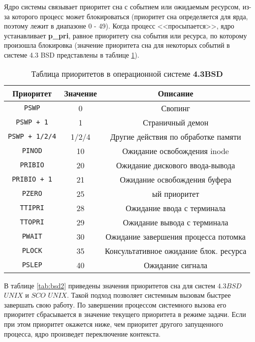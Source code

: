 Ядро системы связывает приоритет сна с событием или ожидаемым ресурсом, из-за которого процесс может блокироваться (приоритет сна определяется для ярда, поэтому лежит в диапазоне 0 - 49). Когда процесс <<просыпается>>, ядро устанавливает \textbf{p\_pri}, равное приоритету сна события или ресурса, по которому произошла блокировка (значение приоритета сна для некоторых событий в системе 4.3 BSD представлены в таблице \ref{tab:bsd}).
\pagebreak
\begin{table}[!h]
	\caption{Таблица приоритетов в операционной системе \textbf{4.3BSD}}
	\label{tab:bsd}
	\begin{center}
		\begin{tabular}{ |c|c|c|  }
			\hline
			\textbf{Приоритет} & \textbf{Значение} & \textbf{Описание} \\
			\hline
			\texttt{PSWP} & 0 & Свопинг \\
			\hline
			\texttt{PSWP + 1} & 1 & Страничный демон \\
			\hline
			\texttt{PSWP + 1/2/4} & 1/2/4 & Другие действия по обработке памяти \\
			\hline
			\texttt{PINOD} & 10 & Ожидание освобождения inode \\
			\hline
			\texttt{PRIBIO} & 20 & Ожидание дискового ввода-вывода \\
			\hline
			\texttt{PRIBIO + 1} & 21 & Ожидание освобождения буфера \\
			\hline
			\texttt{PZERO} & 25 & ый приоритет \\
			\hline
			\texttt{TTIPRI} & 28 & Ожидание ввода с терминала \\
			\hline
			\texttt{TTOPRI} & 29 & Ожидание вывода с терминала \\
			\hline 
			\texttt{PWAIT} & 30 & Ожидание завершения процесса потомка \\
			\hline
			\texttt{PLOCK} & 35 & Консультативное ожидание блок. ресурса \\
			\hline
			\texttt{PSLEP} & 40 & Ожидание сигнала \\
			\hline
		\end{tabular}
	\end{center}
\end{table}

В таблице \ref{tab:bsd2} приведены значения приоритетов сна для систем $4.3BSD$ $UNIX$ и $SCO$ $UNIX$. Такой подход позволяет системным вызовам быстрее завершать свою работу. По завершении процессом системного вызова его приоритет сбрасывается в значение текущего приоритета в режиме задачи. Если при этом приоритет окажется ниже, чем приоритет другого запущенного процесса, ядро произведет переключение контекста.


